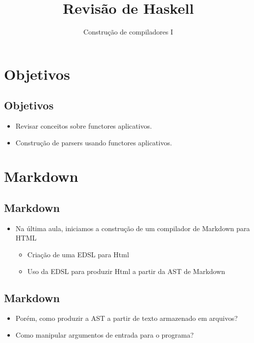 \documentclass[11pt]{article}
\author{Construção de compiladores I}
\date{}
\title{Revisão de Haskell}
\begin{document}
\maketitle
\section*{Objetivos}
\label{sec:org4edcd26}

\subsection*{Objetivos}
\label{sec:org524006c}

\begin{itemize}
\item Revisar conceitos sobre functores aplicativos.

\item Construção de parsers usando functores aplicativos.
\end{itemize}
\section*{Markdown}
\label{sec:org0c7e72c}

\subsection*{Markdown}
\label{sec:orgee23d2f}

\begin{itemize}
\item Na última aula, iniciamos a construção de um compilador de Markdown para HTML
\begin{itemize}
\item Criação de uma EDSL para Html
\item Uso da EDSL para produzir Html a partir da AST de Markdown
\end{itemize}
\end{itemize}
\subsection*{Markdown}
\label{sec:org3712707}

\begin{itemize}
\item Porém, como produzir a AST a partir de texto armazenado em arquivos?

\item Como manipular argumentos de entrada para o programa?
\end{itemize}
\end{document}
